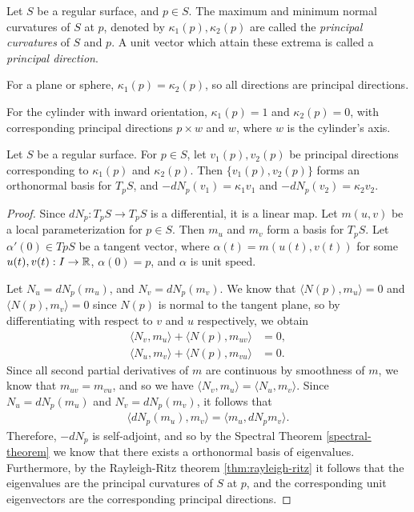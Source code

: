 \begin{defn}
    Let $S$ be a regular surface, and $p \in S$. The maximum and minimum normal curvatures of $S$ at $p$, denoted by $\kappa_1(p), \kappa_2(p)$ are called the \emph{principal curvatures} of $S$ and $p$. A unit vector which attain these extrema is called a \emph{principal direction}.
\end{defn}

\begin{defn}
    For a plane or sphere, $\kappa_1(p) = \kappa_2(p)$, so all directions are principal directions.

    For the cylinder with inward orientation, $\kappa_1(p) = 1$ and $\kappa_2(p) = 0$, with corresponding principal directions $p \times w$ and $w$, where $w$ is the cylinder's axis.
\end{defn}

\begin{thm}\label{thm:principal-directions-gauss-eigenvectors}
    Let $S$ be a regular surface. For $p \in S$, let $v_1(p), v_2(p)$ be principal directions corresponding to $\kappa_1(p)$ and $\kappa_2(p)$. Then $\{v_1(p), v_2(p)\}$ forms an orthonormal basis for $T_pS$, and $-dN_p(v_1) = \kappa_1v_1$ and $-dN_p(v_2) = \kappa_2v_2$.
\end{thm}

\begin{proof}
    Since $dN_{p}: T_pS \to T_pS$ is a differential, it is a linear map. Let $m(u, v)$ be a local parameterization for $p \in S$. Then $m_{u}$ and $m_{v}$ form a basis for $T_pS$. Let $\alpha'(0) \in TpS$ be a tangent vector, where $\alpha(t) = m(u(t), v(t))$ for some $u(t), v(t): I \to \mathbb{R}$, $\alpha(0) = p$, and $\alpha$ is unit speed.
    
    Let $N_u = dN_{p}(m_u)$, and $N_v = dN_{p}(m_v)$. We know that $\langle N(p), m_u \rangle = 0$ and $\langle N(p), m_v\rangle = 0$ since $N(p)$ is normal to the tangent plane, so by differentiating with respect to $v$ and $u$ respectively, we obtain
    \begin{align*}
        \langle N_v, m_u \rangle + \langle N(p), m_{uv}\rangle &= 0, \\
        \langle N_u, m_v \rangle + \langle N(p), m_{vu}\rangle &= 0.
    \end{align*}
    Since all second partial derivatives of $m$ are continuous by smoothness of $m$, we know that $m_{uv} = m_{vu}$, and so we have $\langle N_v, m_u\rangle = \langle N_u, m_v \rangle$. Since $N_u = dN_{p}(m_u)$ and $N_v = dN_{p}(m_v)$, it follows that
    \begin{align*}
        \langle dN_{p}(m_u), m_v \rangle = \langle m_u, dN_{p}m_v\rangle.
    \end{align*}
    Therefore, $-dN_{p}$ is self-adjoint, and so by the Spectral Theorem \ref{spectral-theorem} we know that there exists a orthonormal basis of eigenvalues. Furthermore, by the Rayleigh-Ritz theorem \ref{thm:rayleigh-ritz} it follows that the eigenvalues are the principal curvatures of $S$ at $p$, and the corresponding unit eigenvectors are the corresponding principal directions.
\end{proof}

